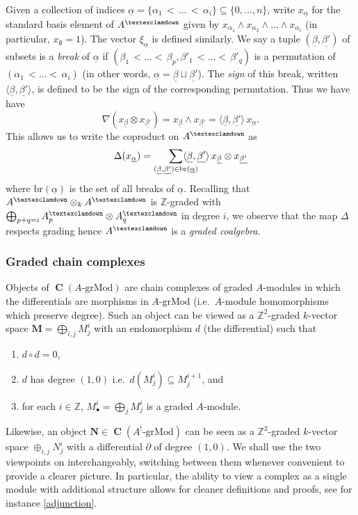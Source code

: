 \documentclass[a4paper]{article}
\theoremstyle{definition}
\theoremstyle{remark}
\newcommand{\grMod}{\ensuremath{\text{-grMod}}}
\DeclareMathOperator{\Ch}{\mathbf{C}}
\newcommand{\gnab}{{\textexclamdown}}
\begin{document}
Given a collection of indices \(\underline{\alpha}=\{\alpha_1\,<\,
...\,<\,\alpha_i\}\subseteq \{0,...,n\}\), write \(x_{\underline{\alpha}}\) for the
standard basis element of \(A^\gnab\) given by \({x_{\alpha_1}\wedge
x_{\alpha_2} \wedge ... \wedge x_{\alpha_i}}\) (in particular,
\(x_\emptyset = 1\)). The vector \(\xi_{\underline{\alpha}}\) is defined
similarly. We say a tuple \((\underline{\beta}, \underline{\beta'})\) of subsets
is a \textit{break} of \(\underline{\alpha}\) if \((\beta_1\,<...<\,\beta_p,
\beta'_1\,<...<\,\beta'_q)\) is a permutation of \((\alpha_1\,<...<\,
\alpha_i)\) (in other words, \(\underline{\alpha} = \underline{\beta} \sqcup
\underline{\beta'}\)). The \textit{sign} of this break, written \(\langle
\underline{\beta}, \underline{\beta'}\rangle\), is defined to be the sign of the
corresponding permutation. Thus we have have 
\[\nabla(x_{\underline{\beta}} \otimes
    x_{\underline{\beta'}})=x_{\underline{\beta}} \wedge
    x_{\underline{\beta'}}=\langle \underline{\beta}, \underline{\beta'}\rangle
\, x_{\underline{\alpha}}.\] 
This allows us to write the coproduct on \(A^\gnab\) as 
\[\Delta(x_{\underline{\alpha}}) =
    \smashoperator[r]{\sum\limits_{(\underline{\beta},\underline{\beta'})\in
    \text{br}(\underline{\alpha})}} \langle \underline{\beta},
\underline{\beta'}\rangle \, x_{\underline{\beta}} \otimes
x_{\underline{\beta'}}\]
where \(\text{br}(\underline{\alpha})\) is the set of all breaks of
\(\underline{\alpha}\).  Recalling that \(A^\gnab\otimes_k A^\gnab\) is
\(\mathbb{Z}\)-graded with \(\bigoplus_{p+q=i}A^\gnab_p\otimes A^\gnab_q\) in
degree \(i\), we observe that the map \(\Delta\) respects grading hence
\(A^\gnab\) is a \textit{graded coalgebra}.

\subsubsection{Graded chain complexes}
\label{subsec-chaincomp}

Objects of \(\Ch(A\grMod)\) are chain complexes of graded \(A\)-modules in
which the differentials are morphisms in \(A\grMod\) (i.e.\ \(A\)-module
homomorphisms which preserve degree). Such an object can be viewed as a
\(\mathbb{Z}^2\)-graded \(k\)-vector space \(\mathbf{M}=\bigoplus_{i,j}M^i_j\)
with an endomorphism \(d\) (the differential) such that 
\begin{enumerate}
    \item \(d\circ d=0\), 
    \item \(d\) has degree \((1,0)\) i.e.\ \(d(M^i_j)\subseteq M^{i+1}_j\),
        and
    \item for each \(i\in \mathbb{Z}\), \(M^i_\bullet = \bigoplus_{j}
        M^i_j\) is a graded \(A\)-module.  
\end{enumerate} 
Likewise, an object \(\mathbf{N}\in \Ch(A^!\grMod)\) can be seen as a
\(\mathbb{Z}^2\)-graded \(k\)-vector space \(\oplus_{i,j}N^i_j\) with a
differential \(\partial\) of degree \((1,0)\). We shall use the two viewpoints
on interchangeably, switching between them whenever convenient to provide a
clearer picture. In particular, the ability to view a complex as a single module
with additional structure allows for cleaner definitions and proofs, see for
instance \cref{adjunction}.
\end{document}
